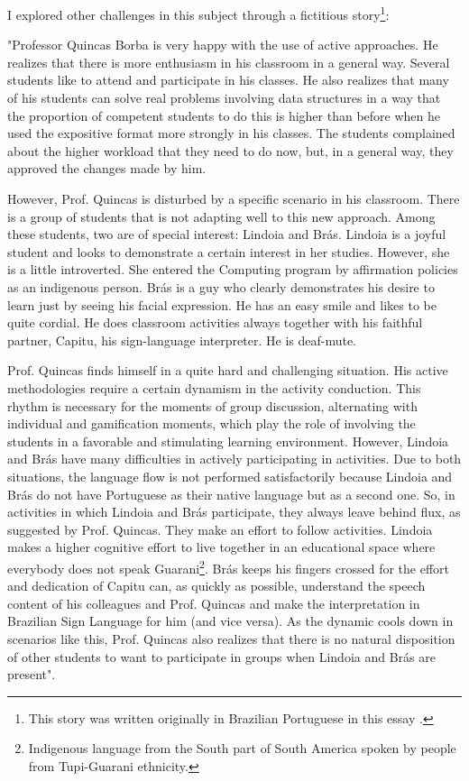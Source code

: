 I explored other challenges in this subject through a fictitious story\footnote{This story was written originally in Brazilian Portuguese in this essay \cite[pp.~277,278]{bispojr:2022-educomp}.}: 
\begin{citacao}
    "Professor Quincas Borba is very happy with the use of active approaches. He realizes that there is more enthusiasm in his classroom in a general way. Several students like to attend and participate in his classes. He also realizes that many of his students can solve real problems involving data structures in a way that the proportion of competent students to do this is higher than before when he used the expositive format more strongly in his classes. The students complained about the higher workload that they need to do now, but, in a general way, they approved the changes made by him.

    However, Prof. Quincas is disturbed by a specific scenario in his classroom. There is a group of students that is not adapting well to this new approach. Among these students, two are of special interest: Lindoia and Brás. Lindoia is a joyful student and looks to demonstrate a certain interest in her studies. However, she is a little introverted. She entered the Computing program by affirmation policies as an indigenous person. Brás is a guy who clearly demonstrates his desire to learn just by seeing his facial expression. He has an easy smile and likes to be quite cordial. He does classroom activities always together with his faithful partner, Capitu, his sign-language interpreter. He is deaf-mute.

    Prof. Quincas finds himself in a quite hard and challenging situation. His active methodologies require a certain dynamism in the activity conduction. This rhythm is necessary for the moments of group discussion, alternating with individual and gamification moments, which play the role of involving the students in a favorable and stimulating learning environment. However, Lindoia and Brás have many difficulties in actively participating in activities. Due to both situations, the language flow is not performed satisfactorily because Lindoia and Brás do not have Portuguese as their native language but as a second one. So, in activities in which Lindoia and Brás participate, they always leave behind flux, as suggested by Prof. Quincas. They make an effort to follow activities. Lindoia makes a higher cognitive effort to live together in an educational space where everybody does not speak Guarani\footnote{Indigenous language from the South part of South America spoken by people from Tupi-Guarani ethnicity.}. Brás keeps his fingers crossed for the effort and dedication of Capitu can, as quickly as possible, understand the speech content of his colleagues and Prof. Quincas and make the interpretation in Brazilian Sign Language for him (and vice versa). As the dynamic cools down in scenarios like this, Prof. Quincas also realizes that there is no natural disposition of other students to want to participate in groups when Lindoia and Brás are present".
\end{citacao}
